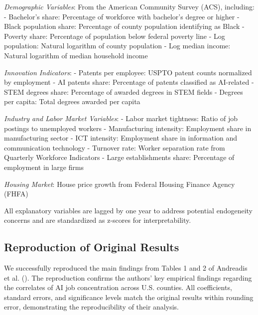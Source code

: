 \documentclass[
]{article}
\begin{document}
\emph{Demographic Variables}: From the American Community Survey (ACS),
including: - Bachelor's share: Percentage of workforce with bachelor's
degree or higher - Black population share: Percentage of county
population identifying as Black - Poverty share: Percentage of
population below federal poverty line - Log population: Natural
logarithm of county population - Log median income: Natural logarithm of
median household income

\emph{Innovation Indicators}: - Patents per employee: USPTO patent
counts normalized by employment - AI patents share: Percentage of
patents classified as AI-related - STEM degrees share: Percentage of
awarded degrees in STEM fields - Degrees per capita: Total degrees
awarded per capita

\emph{Industry and Labor Market Variables}: - Labor market tightness:
Ratio of job postings to unemployed workers - Manufacturing intensity:
Employment share in manufacturing sector - ICT intensity: Employment
share in information and communication technology - Turnover rate:
Worker separation rate from Quarterly Workforce Indicators - Large
establishments share: Percentage of employment in large firms

\emph{Housing Market}: House price growth from Federal Housing Finance
Agency (FHFA)

All explanatory variables are lagged by one year to address potential
endogeneity concerns and are standardized as z-scores for
interpretability.

\subsection{Reproduction of Original
Results}\label{reproduction-of-original-results}

We successfully reproduced the main findings from Tables 1 and 2 of
Andreadis et al. (). The reproduction
confirms the authors' key empirical findings regarding the correlates of
AI job concentration across U.S. counties. All coefficients, standard
errors, and significance levels match the original results within
rounding error, demonstrating the reproducibility of their analysis.
\end{document}
